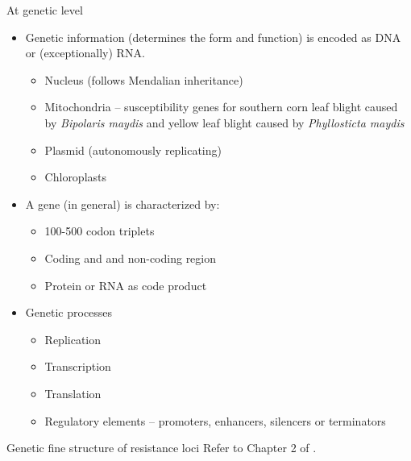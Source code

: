 \documentclass[11pt,dvipsnames,ignorenonframetext,aspectratio=169]{beamer}
\providecommand{\tightlist}{%
  \setlength{\itemsep}{0pt}\setlength{\parskip}{0pt}}
\begin{document}
\begin{frame}{At genetic level}
\protect\hypertarget{at-genetic-level}{}
\footnotesize

\begin{itemize}
\tightlist
\item
  Genetic information (determines the form and function) is encoded as
  DNA or (exceptionally) RNA.

  \begin{itemize}
  \scriptsize
  \item Nucleus (follows Mendalian inheritance)
  \item Mitochondria -- susceptibility genes for southern corn leaf blight caused by \textit{Bipolaris maydis} and yellow leaf blight caused by \textit{Phyllosticta maydis}
  \item Plasmid (autonomously replicating)
  \item Chloroplasts
  \end{itemize}
\item
  A gene (in general) is characterized by:

  \begin{itemize}
  \scriptsize
  \item 100-500 codon triplets
  \item Coding and and non-coding region
  \item Protein or RNA as code product
  \end{itemize}
\item
  Genetic processes

  \begin{itemize}
  \scriptsize
  \item Replication
  \item Transcription
  \item Translation
  \item Regulatory elements -- promoters, enhancers, silencers or terminators
  \end{itemize}
\end{itemize}
\end{frame}

\begin{frame}{Genetic fine structure of resistance loci}
\protect\hypertarget{genetic-fine-structure-of-resistance-loci}{}
Refer to Chapter 2 of \citet{hulbert1997genetic}.
\end{frame}
\end{document}
